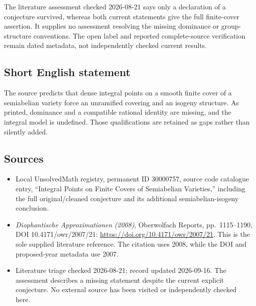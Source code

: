 \documentclass[11pt]{article}
\begin{document}
The literature assessment checked 2026-08-21 says only a declaration of a conjecture survived, whereas both current statements give the full finite-cover assertion. It supplies no assessment resolving the missing dominance or group-structure conventions. The open label and reported complete-source verification remain dated metadata, not independently checked current results.
\subsection{Short English statement}
The source predicts that dense integral points on a smooth finite cover of a semiabelian variety force an unramified covering and an isogeny structure. As printed, dominance and a compatible rational identity are missing, and the integral model is undefined. Those qualifications are retained as gaps rather than silently added.
\subsection{Sources}
\begin{itemize}
\item Local UnsolvedMath registry, permanent ID 30000757, source code catalogue entry, ``Integral Points on Finite Covers of Semiabelian Varieties,'' including the full original/cleaned conjecture and its additional semiabelian-isogeny conclusion.
\item \emph{Diophantische Approximationen (2008)}, Oberwolfach Reports, pp.\ 1115--1190, DOI 10.4171/owr/2007/21: \url{https://doi.org/10.4171/owr/2007/21}. This is the sole supplied literature reference. The citation uses 2008, while the DOI and proposed-year metadata use 2007.
\item Literature triage checked 2026-08-21; record updated 2026-09-16. The assessment describes a missing statement despite the current explicit conjecture. No external source has been visited or independently checked here.
\end{itemize}
\end{document}

